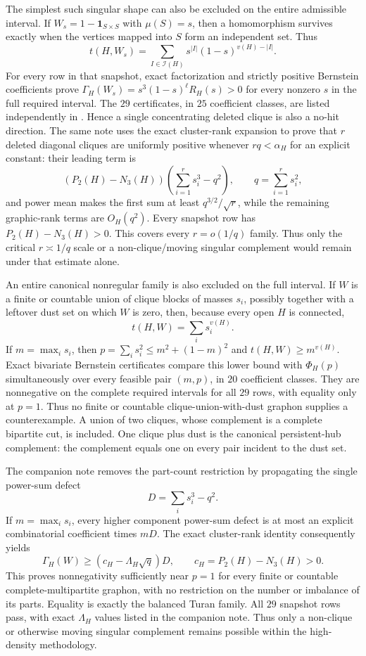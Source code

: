 \documentclass[11pt]{article}
\begin{document}
The simplest such singular shape can also be excluded on the entire
admissible interval.  If $W_s=1-\mathbf 1_{S\times S}$ with $\mu(S)=s$,
then a homomorphism survives exactly when the vertices mapped into $S$ form
an independent set.  Thus
\[
 t(H,W_s)=\sum_{I\in\mathcal I(H)}s^{|I|}(1-s)^{v(H)-|I|}.
\]
For every row in that snapshot, exact factorization and strictly positive
Bernstein coefficients prove
$\Gamma_H(W_s)=s^3(1-s)^\ell R_H(s)>0$ for every nonzero $s$ in the full
required interval.  The $29$ certificates, in $25$ coefficient classes,
are listed independently in
.  Hence a
single concentrating deleted clique is also a no-hit direction.  The same
note uses the exact cluster-rank expansion to prove that $r$ deleted diagonal
cliques are uniformly positive whenever $rq<\alpha_H$ for an explicit
constant: their leading term is
\[
 (P_2(H)-N_3(H))\left(\sum_{i=1}^r s_i^3-q^2\right),
 \qquad q=\sum_{i=1}^r s_i^2,
\]
and power mean makes the first sum at least $q^{3/2}/\sqrt r$, while the
remaining graphic-rank terms are $O_H(q^2)$.  Every snapshot row has
$P_2(H)-N_3(H)>0$.  This covers every $r=o(1/q)$ family.  Thus only the
critical $r\asymp1/q$ scale or a non-clique/moving singular complement
would remain under that estimate alone.

An entire canonical nonregular family is also excluded on the full interval.
If $W$ is a finite or countable union of clique blocks of masses $s_i$,
possibly together with a leftover dust set on which $W$ is zero, then,
because every open $H$ is connected,
\[
 t(H,W)=\sum_i s_i^{v(H)}.
\]
If $m=\max_i s_i$, then
$p=\sum_i s_i^2\leq m^2+(1-m)^2$ and
$t(H,W)\geq m^{v(H)}$.  Exact bivariate Bernstein certificates compare this
lower bound with $\Phi_H(p)$ simultaneously over every feasible pair
$(m,p)$, in $20$ coefficient classes.  They are nonnegative on the complete
required intervals for all $29$ rows, with equality only at $p=1$.  Thus no
finite or countable clique-union-with-dust graphon supplies a counterexample.
A union of two cliques, whose complement is a complete bipartite cut, is
included.  One clique plus dust is the canonical persistent-hub complement:
the complement equals one on every pair incident to the dust set.

The companion note removes the part-count restriction by propagating the
single power-sum defect
\[
 D=\sum_i s_i^3-q^2.
\]
If $m=\max_i s_i$, every higher component power-sum defect is at most an
explicit combinatorial coefficient times $mD$.  The exact cluster-rank
identity consequently yields
\[
 \Gamma_H(W)\geq(c_H-\Lambda_H\sqrt q)D,
 \qquad c_H=P_2(H)-N_3(H)>0.
\]
This proves nonnegativity sufficiently near $p=1$ for every finite or
countable complete-multipartite graphon, with no restriction on the number
or imbalance of its parts.  Equality is exactly the balanced Turan family.
All $29$ snapshot rows pass, with exact $\Lambda_H$ values listed in the
companion note.  Thus only a non-clique or otherwise moving singular
complement remains possible within the high-density methodology.
\end{document}
